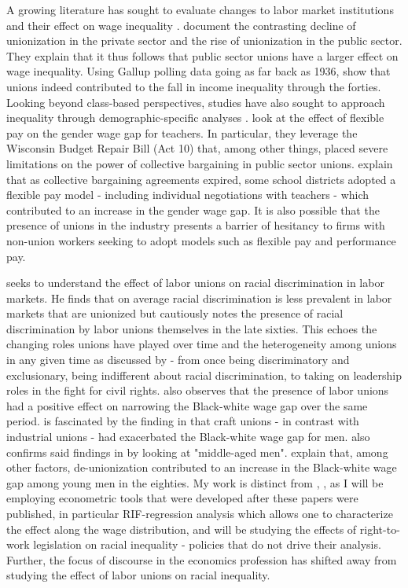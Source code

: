 \documentclass[11pt]{article}
\begin{document}
A growing literature has sought to evaluate changes to labor market institutions and their effect on wage inequality \citep[see, for example,][]{fll2021, fhkn2021, clr2020, ams2016, ffl2009, dfl1996}. \citet{clr2020} document the contrasting decline of unionization in the private sector and the rise of unionization in the public sector. They explain that it thus follows that public sector unions have a larger effect on wage inequality. Using Gallup polling data going as far back as 1936, \citet{fhkn2021} show that unions indeed contributed to the fall in income inequality through the forties. Looking beyond class-based perspectives, studies have also sought to approach inequality through demographic-specific analyses \citep[see, for example,][]{biasisarsons2020, blaukahn1996}. \citet{biasisarsons2020} look at the effect of flexible pay on the gender wage gap for teachers. In particular, they leverage the Wisconsin Budget Repair Bill (Act 10) that, among other things, placed severe limitations on the power of collective bargaining in public sector unions. \citet{biasisarsons2020} explain that as collective bargaining agreements expired, some school districts adopted a flexible pay model - including individual negotiations with teachers - which contributed to an increase in the gender wage gap. It is also possible that the presence of unions in the industry presents a barrier of hesitancy to firms with non-union workers seeking to adopt models such as flexible pay and performance pay.

\citet{ashenfelter1972} seeks to understand the effect of labor unions on racial discrimination in labor markets. He finds that on average racial discrimination is less prevalent in labor markets that are unionized but cautiously notes the presence of racial discrimination by labor unions themselves in the late sixties. This echoes the changing roles unions have played over time and the heterogeneity among unions in any given time as discussed by \citet{frymer2007} - from once being discriminatory and exclusionary, being indifferent about racial discrimination, to taking on leadership roles in the fight for civil rights. \citet{ashenfelter1972} also observes that the presence of labor unions had a positive effect on narrowing the Black-white wage gap over the same period. \citet{leigh1978} is fascinated by the finding in \citet{ashenfelter1972} that craft unions - in contrast with industrial unions - had exacerbated the Black-white wage gap for men. \citet{leigh1978} also confirms said findings in \citet{ashenfelter1972} by looking at "middle-aged men". \citet{boundfreeman1992} explain that, among other factors, de-unionization contributed to an increase in the Black-white wage gap among young men in the eighties. My work is distinct from \citet{ashenfelter1972}, \citet{leigh1978}, \citet{boundfreeman1992} as I will be employing econometric tools that were developed after these papers were published, in particular RIF-regression analysis which allows one to characterize the effect along the wage distribution, and will be studying the effects of right-to-work legislation on racial inequality - policies that do not drive their analysis. Further, the focus of discourse in the economics profession has shifted away from studying the effect of labor unions on racial inequality.
\end{document}
